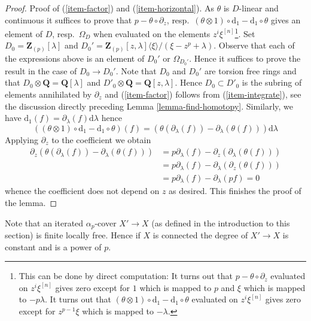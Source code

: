 \begin{proof}
\medskip\noindent
Proof of (\ref{item-factor}) and (\ref{item-horizontal}).
As $\theta$ is $D$-linear and continuous it suffices to prove that
$p - \theta \circ \partial_z$,
resp.\ $(\theta \otimes 1) \circ \text{d}_1 - \text{d}_1 \circ \theta$
gives an element of $D$, resp.\ $\Omega_D$ when evaluated on the
elements $z^i\xi^{[n]}$\footnote{This can be done by direct computation:
It turns out that $p - \theta \circ \partial_z$ evaluated on
$z^i\xi^{[n]}$ gives zero except for $1$ which is mapped to $p$ and
$\xi$ which is mapped to $-p\lambda$. It turns out that 
$(\theta \otimes 1) \circ \text{d}_1 - \text{d}_1 \circ \theta$
evaluated on $z^i\xi^{[n]}$ gives zero except for $z^{p - 1}\xi$
which is mapped to $-\lambda$.}.
Set $D_0 = \mathbf{Z}_{(p)}[\lambda]$ and
$D_0' = \mathbf{Z}_{(p)}[z, \lambda]\langle \xi \rangle/(\xi - z^p + \lambda)$.
Observe that each of the expressions above is an element of
$D_0'$ or $\Omega_{D_0'}$. Hence it suffices to prove the result
in the case of $D_0 \to D_0'$. Note that $D_0$ and $D_0'$
are torsion free rings and that $D_0 \otimes \mathbf{Q} = \mathbf{Q}[\lambda]$
and $D'_0 \otimes \mathbf{Q} = \mathbf{Q}[z, \lambda]$.
Hence $D_0 \subset D'_0$ is the subring of elements annihilated
by $\partial_z$ and (\ref{item-factor})
follows from (\ref{item-integrate}), see the discussion directly preceding
Lemma \ref{lemma-find-homotopy}. Similarly, we have
$\text{d}_1(f) = \partial_\lambda(f)\text{d}\lambda$ hence
$$
\left((\theta \otimes 1) \circ \text{d}_1 - \text{d}_1 \circ \theta\right)(f)
=
\left(\theta(\partial_\lambda(f)) - \partial_\lambda(\theta(f))\right)
\text{d}\lambda
$$
Applying $\partial_z$ to the coefficient we obtain
\begin{align*}
\partial_z\left(
\theta(\partial_\lambda(f)) - \partial_\lambda(\theta(f))
\right)
& =
p \partial_\lambda(f) - \partial_z(\partial_\lambda(\theta(f))) \\
& =
p \partial_\lambda(f) - \partial_\lambda(\partial_z(\theta(f))) \\
& =
p \partial_\lambda(f) - \partial_\lambda(p f) = 0
\end{align*}
whence the coefficient does not depend on $z$ as desired.
This finishes the proof of the lemma.
\end{proof}

\noindent
Note that an iterated $\alpha_p$-cover $X' \to X$ (as defined in the
introduction to this section) is finite locally free. Hence if $X$ is
connected the degree of $X' \to X$ is constant and is a power of $p$.

